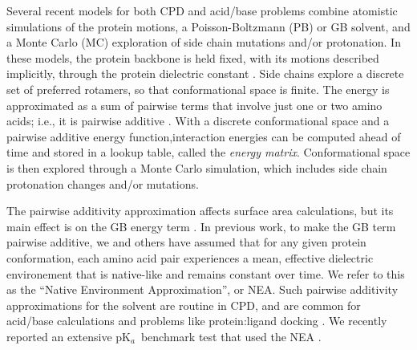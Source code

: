 \documentclass[a4paper,12pt]{article}
\newcommand{\pk}{pK$_a$}
\begin{document}
Several recent models for both CPD \cite{Baker06b,Kuhlman06,Guerois07,Lippow07,Pleiss11, Pantazes11,Saven11,Samish11,
Simonson13b} and acid/base problems \cite{You95,Beroza96,Georgescu02,Kim05,Song09,Aleksandrov10b,Baptista97,Lee04,
Mongan04,Khandogin06,Machuqueiro08,Wallace09,Arthur11} combine atomistic simulations of the protein motions, a
Poisson-Boltzmann (PB) or GB solvent, and a Monte Carlo (MC) exploration of side chain mutations and/or protonation.
In these models, the protein backbone is held fixed, with its motions described implicitly, through the protein
dielectric constant \cite{Simonson13}. Side chains explore a discrete set of preferred rotamers, so that conformational
space is finite. The energy is approximated as a sum of pairwise terms that involve just one or two amino acids; i.e.,
it is pairwise additive \cite{Lopes07,Schmidt08,Schmidt08b,Polydorides11,Simonson13b,Gaillard14}. With a discrete
conformational space and a pairwise additive energy function,interaction energies can be computed ahead of time and
stored in a lookup table, called the {\it energy matrix}. Conformational space is then explored through a Monte Carlo
simulation, which includes side chain protonation changes and/or mutations.

The pairwise additivity approximation affects surface area calculations, but its main effect is on the GB energy term
\cite{Polydorides13,Gaillard14}. In previous work, to make the GB term pairwise additive, we and others have assumed
that for any given protein conformation, each amino acid pair experiences a mean, effective dielectric environement
that is native-like and remains constant over time. We refer to this as the ``Native Environment Approximation'',
or NEA. Such pairwise additivity approximations for the solvent are routine in CPD, and are common for acid/base
calculations \cite{Georgescu02,Gunner11} and problems like protein:ligand docking \cite{Majeux00,Ruvinsky07}.
We recently reported an extensive \pk\ benchmark test that used the NEA \cite{Polydorides13}.
\end{document}
